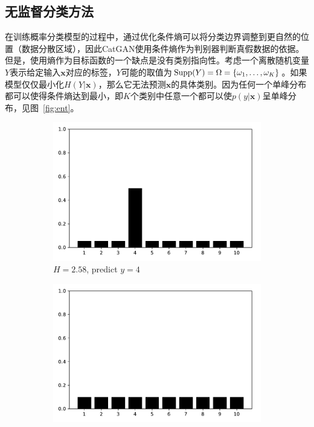 \subsection{无监督分类方法}\label{sec:icg-us}
在训练概率分类模型的过程中，通过优化条件熵可以将分类边界调整到更自然的位置（数据分散区域）\cite{grandvalet2005semi}，因此CatGAN使用条件熵作为判别器判断真假数据的依据。但是，使用熵作为目标函数的一个缺点是没有类别指向性。考虑一个离散随机变量$Y$表示给定输入$\mathbf{x}$对应的标签，$Y$可能的取值为$\text{Supp}(Y) = \Omega =\{\omega_1, \dots, \omega_K\}$。如果模型仅仅最小化$H(Y|\mathbf{x})$，那么它无法预测$\mathbf{x}$的具体类别。因为任何一个单峰分布都可以使得条件熵达到最小，即$K$个类别中任意一个都可以使$p(y|\mathbf{x})$呈单峰分布，见图~\ref{fig:ent}。
\begin{figure}[htbp]
  \centering
  \begin{subfigure}[b]{\trif\textwidth}
    \includegraphics[width=\textwidth]{Img/enta.pdf}
    \caption{$H = 2.58$, predict $y=4$}
  \end{subfigure}
  \begin{subfigure}[b]{\trif\textwidth}
    \includegraphics[width=\textwidth]{Img/entb.pdf}

\end{subfigure}
\end{figure}
